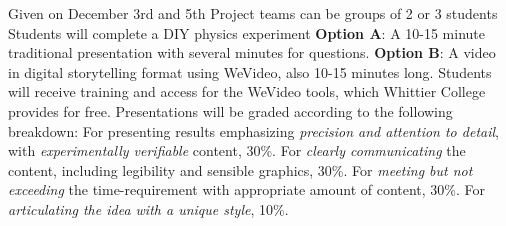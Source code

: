 \documentclass[10pt]{article}
\begin{document}
\begin{outline}[enumerate]
\2 Given on December 3rd and 5th
\2 Project teams can be groups of 2 or 3 students
\2 Students will complete a DIY physics experiment
\2 \textbf{Option A}: A 10-15 minute traditional presentation with several minutes for questions.
\2 \textbf{Option B}: A video in digital storytelling format using WeVideo, also 10-15 minutes long.
\2 Students will receive training and access for the WeVideo tools, which Whittier College provides for free.
\2 Presentations will be graded according to the following breakdown:
\3 For presenting results emphasizing \textit{precision and attention to detail}, with \textit{experimentally verifiable} content, 30\%.
\3 For \textit{clearly communicating} the content, including legibility and sensible graphics, 30\%.
\3 For \textit{meeting but not exceeding} the time-requirement with appropriate amount of content, 30\%.
\3 For \textit{articulating the idea with a unique style}, 10\%.
\end{outline}
\end{document}
